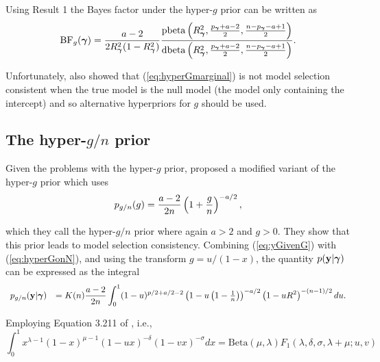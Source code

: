 \noindent Using Result 1 the Bayes factor under the hyper-$g$ prior can be
written as
\begin{equation}\label{eq:hyperGmarginal2}
	\displaystyle \mbox{BF}_{g}({\boldsymbol \gamma}) 
	=  
	\frac{a - 2}{2 R_{\boldsymbol \gamma}^2(1 - R_{\boldsymbol \gamma}^2)} 
	\frac{\mbox{pbeta}\left(R_{\boldsymbol \gamma}^2,\tfrac{p_{\boldsymbol \gamma} + a - 2}{2},\tfrac{n-p_{\boldsymbol \gamma} - a+1}{2}\right)}{
		\mbox{dbeta}\left(R_{\boldsymbol \gamma}^2,\tfrac{p_{\boldsymbol \gamma} + a - 2}{2},\tfrac{n-p_{\boldsymbol \gamma} - a+1}{2}\right)}.
\end{equation}

\noindent Unfortunately, \cite{Liang2008} also showed that
(\ref{eq:hyperGmarginal}) is not model selection consistent when the true model
is the null model (the model only containing the intercept) and so alternative
hyperpriors for $g$ should be used.

\subsection{The hyper-$g/n$ prior}

Given the problems with the hyper-$g$ prior, \cite{Liang2008} proposed a
modified variant of the hyper-$g$ prior which uses
\begin{equation}\label{eq:hyperGonN}
	\displaystyle p_{g/n}(g) = \frac{a - 2}{2n}\left( 1 + \frac{g}{n} \right)^{-a/2},
\end{equation}

\noindent which they call the hyper-$g/n$ prior where again $a>2$ and $g>0$.
They show that this prior leads to model selection consistency.  Combining
(\ref{eq:yGivenG}) with (\ref{eq:hyperGonN}), and using the transform $g = u/(1
- x)$, the quantity $p({\bf y}|{\boldsymbol \gamma})$ can be expressed as the integral
\begin{equation}\label{eq:hyperGonNmarginalIntegral}
	\begin{array}{rl}
		p_{g/n}({\bf y}|{\boldsymbol \gamma}) 
		& \displaystyle = K(n) \frac{a - 2}{2n}  \int_0^1 
		(1 - u)^{p/2 + a/2 - 2  } \left(  1 - u \left(1  -  \tfrac{1}{n} \right) \right)^{-a/2} \left(  1 - u R^2\right)^{-(n-1)/2} du.
	\end{array} 
\end{equation}

\noindent  Employing Equation 3.211 of \cite{Gradshteyn2007}, i.e.,
$$
\int_0^1 x^{\lambda-1}(1 - x)^{\mu - 1}(1 - u x)^{-\delta}(1 - vx)^{-\sigma} dx = \mbox{Beta}(\mu,\lambda) F_1(\lambda,\delta,\sigma,\lambda+\mu;u,v) 
$$

